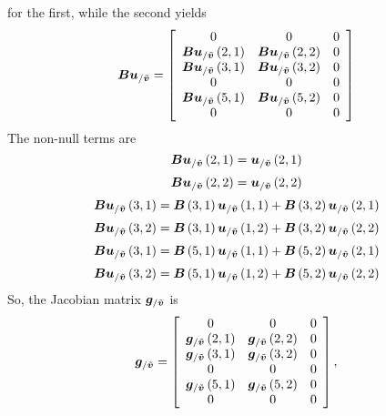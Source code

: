 for the first, while the second yields
\begin{equation}
\bm{B} \bm{u}_{/\tilde{\bm{v}}} = \left[
	\begin{array}{ccc}
		0 & 0 & 0 \\
		\bm{B} \bm{u}_{/\tilde{\bm{v}}}\left( 2,1 \right) &
		\bm{B} \bm{u}_{/\tilde{\bm{v}}}\left( 2,2 \right) & 0 \\
		\bm{B} \bm{u}_{/\tilde{\bm{v}}}\left( 3,1 \right) &
		\bm{B} \bm{u}_{/\tilde{\bm{v}}}\left( 3,2 \right) & 0 \\
		0 & 0 & 0 \\
		\bm{B} \bm{u}_{/\tilde{\bm{v}}}\left( 5,1 \right) &
		\bm{B} \bm{u}_{/\tilde{\bm{v}}}\left( 5,2 \right) & 0 \\
		0 & 0 & 0 
	\end{array} \right]
\end{equation}
The non-null terms are
\begin{equation}
\bm{B} \bm{u}_{/\tilde{\bm{v}}}\left( 2,1 \right)  = \bm{u}_{/\tilde{\bm{v}}}\left( 2,1 \right)
\end{equation}
\begin{equation}
\bm{B} \bm{u}_{/\tilde{\bm{v}}}\left( 2,2 \right)  = \bm{u}_{/\tilde{\bm{v}}}\left( 2,2 \right)
\end{equation}
\begin{equation}
\bm{B} \bm{u}_{/\tilde{\bm{v}}}\left( 3,1 \right)  = \bm{B}\left( 3,1 \right)\bm{u}_{/\tilde{\bm{v}}}\left( 1,1 \right)+
					\bm{B}\left( 3,2 \right)\bm{u}_{/\tilde{\bm{v}}}\left( 2,1 \right)
\end{equation}
\begin{equation}
\bm{B} \bm{u}_{/\tilde{\bm{v}}}\left( 3,2 \right)  = \bm{B}\left( 3,1 \right)\bm{u}_{/\tilde{\bm{v}}}\left( 1,2 \right)+
					\bm{B}\left( 3,2 \right)\bm{u}_{/\tilde{\bm{v}}}\left( 2,2 \right)
\end{equation}
\begin{equation}
\bm{B} \bm{u}_{/\tilde{\bm{v}}}\left( 3,1 \right)  = \bm{B}\left( 5,1 \right)\bm{u}_{/\tilde{\bm{v}}}\left( 1,1 \right)+
					\bm{B}\left( 5,2 \right)\bm{u}_{/\tilde{\bm{v}}}\left( 2,1 \right)
\end{equation}
\begin{equation}
\bm{B} \bm{u}_{/\tilde{\bm{v}}}\left( 3,2 \right)  = \bm{B}\left( 5,1 \right)\bm{u}_{/\tilde{\bm{v}}}\left( 1,2 \right)+
					\bm{B}\left( 5,2 \right)\bm{u}_{/\tilde{\bm{v}}}\left( 2,2 \right)
\end{equation}
So, the Jacobian matrix $\bm{g}_{/\tilde{\bm{v}}}$ is
\begin{equation}
\bm{g}_{/\tilde{\bm{v}}} = \left[
	\begin{array}{ccc}
		0 & 0 & 0 \\
		\bm{g}_{/\tilde{\bm{v}}}\left( 2,1 \right) &
		\bm{g}_{/\tilde{\bm{v}}}\left( 2,2 \right) & 0 \\
		\bm{g}_{/\tilde{\bm{v}}}\left( 3,1 \right) &
		\bm{g}_{/\tilde{\bm{v}}}\left( 3,2 \right) & 0 \\
		0 & 0 & 0 \\
		\bm{g}_{/\tilde{\bm{v}}}\left( 5,1 \right) &
		\bm{g}_{/\tilde{\bm{v}}}\left( 5,2 \right) & 0 \\
		0 & 0 & 0 
	\end{array} \right]
	,
\end{equation}
